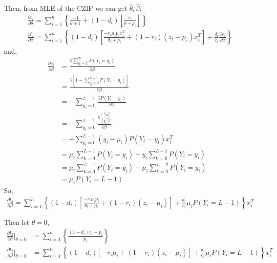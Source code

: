 \documentclass[11pt]{article}
\numberwithin{equation}{section}
\begin{document}
Then, from MLE of the CZIP we can get $\hat{\theta},\hat{\beta}$;
\begin{align}
               &\frac{\partial{l_2}}{\partial{\theta}}=\sum_{i=1}^n \left\{ \frac{-1}{\theta+1} + (1-d_i)
                  \left[\frac{r_i}{\theta+p_i} \right]
                 \right\} \\
                &\frac{\partial{l_2}}{\partial{\beta}}=\sum_{i=1}^n \left\{(1-d_i)\left[
                \frac{-r_i\mu_i p_i x_i^T}{\theta_i +  p_i}
                +(1-r_i)(z_i-\mu_i)x_i^T\right]
                +\frac{d_i}{c_i}\frac{\partial{c_i}}{\partial{\beta}} \right\} 
\end{align}
and,
\begin{align}
            \frac{\partial{c_i}}{\partial{\beta}}&=
            \frac{\partial{\sum_{y_i=L}^{\infty}{P(Y_i=y_i)}}}{\partial{\beta}} \\
            &=\frac{\partial{\left[1-\sum_{y_i=0}^{L-1}{P(Y_i=y_i)}\right]}}{\partial{\beta}} \nonumber\\
           &=-\sum_{y_i=0}^{L-1}\frac{\partial{{P(Y_i=y_i)}}}{\partial{\beta}} \nonumber\\
           &=-\sum_{y_i=0}^{L-1}\frac{\partial{{\frac{e^{-\mu_i}\mu_i^{y_i}}{(y_i)!}}}}{\partial{\beta}} \nonumber\\
           &=-\sum_{y_i=0}^{L-1}(y_i-\mu_i)P(Y_i=y_i)x_i^T \nonumber\\
           &=\mu_i\sum_{k=0}^{L-1}P(Y_i=y_i)-y_i\sum_{k=0}^{L-1}P(Y_i=y_i) \nonumber\\ &=\mu_i\sum_{k=0}^{L-1}P(Y_i=y_i)-\mu_i\sum_{k=0}^{L-2}P(Y_i=y_i)\nonumber\\
        &=\mu_iP(Y_i=L-1)
\end{align}
So,
\begin{align}
            \frac{\partial{l_2}}{\partial{\beta}}=\sum_{i=1}^n \left\{(1-d_i)\left[
            \frac{-r_i\mu_i p_i}{\theta_i +  p_i}
            +(1-r_i)(z_i-\mu_i)\right]
            +\frac{d_i}{c_i}\mu_iP(Y_i=L-1) \right\}x_i^T
\end{align}

Then let $\theta=0$,
\begin{align}
            \frac{\partial{l_2}}{\partial{\theta}}|_{\theta=0}&=\sum_{i=1}^n \left\{
             \frac{(1-d_i)r_i-p_i}{p_i} \right\} \\
             \frac{\partial{l_2}}{\partial{\beta}}|_{\theta=0}&=\sum_{i=1}^n \left\{(1-d_i)\left[
            -r_i\mu_i
            +(1-r_i)(z_i-\mu_i)\right]
            +\frac{d_i}{c_i}\mu_iP(Y_i=L-1) \right\}x_i^T
\end{align}
\end{document}

